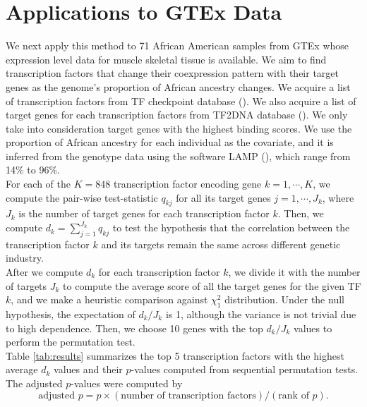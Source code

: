 \documentclass[aap,authoryear, preprint]{imsart}
\numberwithin{equation}{section}
\theoremstyle{plain}
\begin{document}
\section{Applications to GTEx Data} \label{sec:applications}
We next apply this method to 71 African American samples from GTEx \cite{gtex2015genotype} whose expression level data for muscle skeletal tissue is available. We aim to find transcription factors that change their coexpression pattern with their target genes as the genome's proportion of African ancestry changes. We acquire a list of transcription factors from TF checkpoint database (\cite{chawla2013tfcheckpoint}). We also acquire a list of target genes for each transcription factors from TF2DNA database (\cite{pujato2014prediction}). We only take into consideration target genes with the highest binding scores. We use the proportion of African ancestry for each individual as the covariate, and it is inferred from the genotype data using the software LAMP (\cite{pacsaniuc2009imputation}), which range from 14\% to 96\%.\\ 

For each of the $K = 848$ transcription factor encoding gene $k = 1, \cdots, K$, we compute the pair-wise test-statistic $q_{kj}$ for all its target genes $j = 1, \cdots, J_k$, where $J_k$ is the number of target genes for each transcription factor $k$. Then, we compute $d_k = \sum_{j=1}^{J_k} q_{kj}$ to test the hypothesis that the correlation between the transcription factor $k$ and its targets remain the same across different genetic industry. \\

After we compute $d_{k}$ for each transcription factor $k$, we divide it with the number of targets $J_k$ to compute the average score of all the target genes for the given TF $k$, and we make a heuristic comparison against $\chi_1^2$ distribution. Under the null hypothesis, the expectation of $d_k/J_k$ is 1, although the variance is not trivial due to high dependence. Then, we choose 10 genes with the top $d_{k}/J_k$ values to perform the permutation test. \\

Table \ref{tab:results} summarizes the top 5 transcription factors with the highest average $d_k$ values and their $p$-values computed from sequential permutation tests. The adjusted $p$-values were computed by
$$\text{adjusted } p = p \times (\text{number of transcription factors}) / (\text{rank of $p$}).$$
\end{document}
